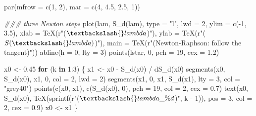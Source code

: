 \documentclass[
  letterpaper,
  DIV=11,
  numbers=noendperiod]{scrreprt}
\newenvironment{Shaded}{\begin{snugshade}}{\end{snugshade}}
\newcommand{\AttributeTok}[1]{\textcolor[rgb]{0.40,0.45,0.13}{#1}}
\newcommand{\ControlFlowTok}[1]{\textcolor[rgb]{0.00,0.23,0.31}{\textbf{#1}}}
\newcommand{\DecValTok}[1]{\textcolor[rgb]{0.68,0.00,0.00}{#1}}
\newcommand{\DocumentationTok}[1]{\textcolor[rgb]{0.37,0.37,0.37}{\textit{#1}}}
\newcommand{\FloatTok}[1]{\textcolor[rgb]{0.68,0.00,0.00}{#1}}
\newcommand{\FunctionTok}[1]{\textcolor[rgb]{0.28,0.35,0.67}{#1}}
\newcommand{\NormalTok}[1]{\textcolor[rgb]{0.00,0.23,0.31}{#1}}
\newcommand{\OtherTok}[1]{\textcolor[rgb]{0.00,0.23,0.31}{#1}}
\newcommand{\SpecialCharTok}[1]{\textcolor[rgb]{0.37,0.37,0.37}{#1}}
\newcommand{\StringTok}[1]{\textcolor[rgb]{0.13,0.47,0.30}{#1}}
\begin{document}
\begin{Shaded}
\begin{Highlighting}[]
\FunctionTok{par}\NormalTok{(}\AttributeTok{mfrow =} \FunctionTok{c}\NormalTok{(}\DecValTok{1}\NormalTok{, }\DecValTok{2}\NormalTok{), }\AttributeTok{mar =} \FunctionTok{c}\NormalTok{(}\DecValTok{4}\NormalTok{, }\FloatTok{4.5}\NormalTok{, }\FloatTok{2.5}\NormalTok{, }\DecValTok{1}\NormalTok{))}

\DocumentationTok{\#\#\# three Newton steps}
\FunctionTok{plot}\NormalTok{(lam, }\FunctionTok{S\_d}\NormalTok{(lam), }\AttributeTok{type =} \StringTok{"l"}\NormalTok{, }\AttributeTok{lwd =} \DecValTok{2}\NormalTok{, }\AttributeTok{ylim =} \FunctionTok{c}\NormalTok{(}\SpecialCharTok{{-}}\DecValTok{1}\NormalTok{, }\FloatTok{3.5}\NormalTok{),}
     \AttributeTok{xlab =} \FunctionTok{TeX}\NormalTok{(r}\StringTok{"($\textbackslash{}lambda$)"}\NormalTok{), }\AttributeTok{ylab =} \FunctionTok{TeX}\NormalTok{(r}\StringTok{"($S(\textbackslash{}lambda)$)"}\NormalTok{),}
     \AttributeTok{main =} \FunctionTok{TeX}\NormalTok{(r}\StringTok{"(Newton{-}Raphson: follow the tangent)"}\NormalTok{))}
\FunctionTok{abline}\NormalTok{(}\AttributeTok{h =} \DecValTok{0}\NormalTok{, }\AttributeTok{lty =} \DecValTok{3}\NormalTok{)}
\FunctionTok{points}\NormalTok{(lstar, }\DecValTok{0}\NormalTok{, }\AttributeTok{pch =} \DecValTok{19}\NormalTok{, }\AttributeTok{cex =} \FloatTok{1.2}\NormalTok{)}

\NormalTok{x0 }\OtherTok{\textless{}{-}} \FloatTok{0.45}
\ControlFlowTok{for}\NormalTok{ (k }\ControlFlowTok{in} \DecValTok{1}\SpecialCharTok{:}\DecValTok{3}\NormalTok{) \{}
\NormalTok{  x1 }\OtherTok{\textless{}{-}}\NormalTok{ x0 }\SpecialCharTok{{-}} \FunctionTok{S\_d}\NormalTok{(x0) }\SpecialCharTok{/} \FunctionTok{dS\_d}\NormalTok{(x0)}
  \FunctionTok{segments}\NormalTok{(x0, }\FunctionTok{S\_d}\NormalTok{(x0), x1, }\DecValTok{0}\NormalTok{, }\AttributeTok{col =} \DecValTok{2}\NormalTok{, }\AttributeTok{lwd =} \DecValTok{2}\NormalTok{)}
  \FunctionTok{segments}\NormalTok{(x1, }\DecValTok{0}\NormalTok{, x1, }\FunctionTok{S\_d}\NormalTok{(x1), }\AttributeTok{lty =} \DecValTok{3}\NormalTok{, }\AttributeTok{col =} \StringTok{"grey40"}\NormalTok{)}
  \FunctionTok{points}\NormalTok{(}\FunctionTok{c}\NormalTok{(x0, x1), }\FunctionTok{c}\NormalTok{(}\FunctionTok{S\_d}\NormalTok{(x0), }\DecValTok{0}\NormalTok{), }\AttributeTok{pch =} \DecValTok{19}\NormalTok{, }\AttributeTok{col =} \DecValTok{2}\NormalTok{, }\AttributeTok{cex =} \FloatTok{0.7}\NormalTok{)}
  \FunctionTok{text}\NormalTok{(x0, }\FunctionTok{S\_d}\NormalTok{(x0), }\FunctionTok{TeX}\NormalTok{(}\FunctionTok{sprintf}\NormalTok{(r}\StringTok{"($\textbackslash{}lambda\_\%d$)"}\NormalTok{, k }\SpecialCharTok{{-}} \DecValTok{1}\NormalTok{)), }\AttributeTok{pos =} \DecValTok{3}\NormalTok{, }\AttributeTok{col =} \DecValTok{2}\NormalTok{, }\AttributeTok{cex =} \FloatTok{0.9}\NormalTok{)}
\NormalTok{  x0 }\OtherTok{\textless{}{-}}\NormalTok{ x1}
\NormalTok{\}}


\end{Highlighting}
\end{Shaded}
\end{document}
